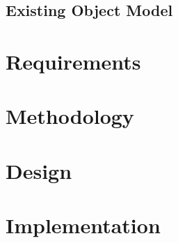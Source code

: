 \documentclass[11pt]{book}
\begin{document}
\section{Existing Object Model}	
		


\chapter{Requirements}

\chapter{Methodology}

\chapter{Design}

\chapter{Implementation}
\end{document}
